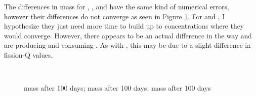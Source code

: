 The differences in mass for , , and  have the same kind of numerical errors, however
their differences do not converge as seen in Figure \ref{fig:am-cm-mass-eol}.
For  and , I hypothesize they just need more time to build up to
concentrations where they would converge. However, there appears to be an actual difference
in the way \OpenMC and \SerpentTWO are producing and consuming . As with
, this may be due to a slight difference in fission-Q values.

\begin{figure}[htpb]
    \centering
    \\
    \caption[, , and  mass after to 100 days]{
      mass after 100 days;
      mass after 100 days;
      mass after 100 days}
    \label{fig:am-cm-mass-eol}
\end{figure}


